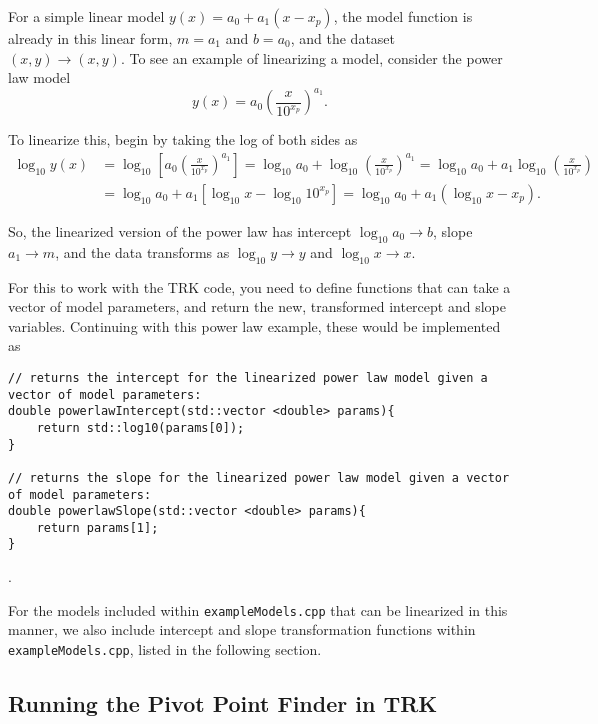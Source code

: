 \documentclass[12pt]{article}
\newcommand{\li}{\lstinline}
\begin{document}
For a simple linear model $y(x)=a_0+a_1(x-x_p)$, the model function is already in this linear form, $m=a_1$ and $b=a_0$, and the dataset $(x,y)\rightarrow (x,y)$. To see an example of linearizing a model, consider the power law model 
\begin{equation}
    y(x)=a_0\left(\frac{x}{10^{x_p}}\right)^{a_1}.
\end{equation}

To linearize this, begin by taking the log of both sides as
\begin{equation}
\begin{split}
    \log_{10}y(x)&=\log_{10}\left[a_0\left(\frac{x}{10^{x_p}}\right)^{a_1}\right]=\log_{10}a_0 + \log_{10}\left(\frac{x}{10^{x_p}}\right)^{a_1}=\log_{10}a_0 + a_1\log_{10}\left(\frac{x}{10^{x_p}}\right)\\&= \log_{10}a_0 + a_1\left[\log_{10}x - \log_{10}10^{x_p}\right] = \log_{10}a_0 + a_1\left(\log_{10}x - x_p\right).
\end{split}
\end{equation}

So, the linearized version of the power law has intercept $\log_{10}a_0\rightarrow b$, slope $a_1\rightarrow m$, and the data transforms as $\log_{10}y\rightarrow y$ and $\log_{10}x\rightarrow x$.

For this to work with the TRK code, you need to define functions that can take a vector of model parameters, and return the new, transformed intercept and slope variables. Continuing with this power law example, these would be implemented as
\begin{lstlisting}
// returns the intercept for the linearized power law model given a vector of model parameters:
double powerlawIntercept(std::vector <double> params){
    return std::log10(params[0]);
}

// returns the slope for the linearized power law model given a vector of model parameters:
double powerlawSlope(std::vector <double> params){
    return params[1];
}
\end{lstlisting}.

For the models included within \li{exampleModels.cpp} that can be linearized in this manner, we also include intercept and slope transformation functions within \li{exampleModels.cpp}, listed in the following section.

\subsection{Running the Pivot Point Finder in TRK}
\end{document}
